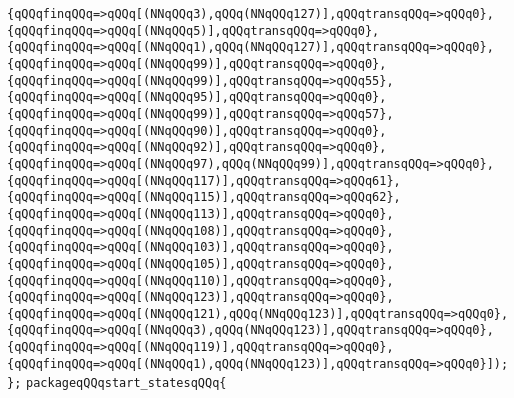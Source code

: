 \verb|{qQQqfinqQQq=>qQQq[(NNqQQq3),qQQq(NNqQQq127)],qQQqtransqQQq=>qQQq0},|\newline
\verb|{qQQqfinqQQq=>qQQq[(NNqQQq5)],qQQqtransqQQq=>qQQq0},|\newline
\verb|{qQQqfinqQQq=>qQQq[(NNqQQq1),qQQq(NNqQQq127)],qQQqtransqQQq=>qQQq0},|\newline
\verb|{qQQqfinqQQq=>qQQq[(NNqQQq99)],qQQqtransqQQq=>qQQq0},|\newline
\verb|{qQQqfinqQQq=>qQQq[(NNqQQq99)],qQQqtransqQQq=>qQQq55},|\newline
\verb|{qQQqfinqQQq=>qQQq[(NNqQQq95)],qQQqtransqQQq=>qQQq0},|\newline
\verb|{qQQqfinqQQq=>qQQq[(NNqQQq99)],qQQqtransqQQq=>qQQq57},|\newline
\verb|{qQQqfinqQQq=>qQQq[(NNqQQq90)],qQQqtransqQQq=>qQQq0},|\newline
\verb|{qQQqfinqQQq=>qQQq[(NNqQQq92)],qQQqtransqQQq=>qQQq0},|\newline
\verb|{qQQqfinqQQq=>qQQq[(NNqQQq97),qQQq(NNqQQq99)],qQQqtransqQQq=>qQQq0},|\newline
\verb|{qQQqfinqQQq=>qQQq[(NNqQQq117)],qQQqtransqQQq=>qQQq61},|\newline
\verb|{qQQqfinqQQq=>qQQq[(NNqQQq115)],qQQqtransqQQq=>qQQq62},|\newline
\verb|{qQQqfinqQQq=>qQQq[(NNqQQq113)],qQQqtransqQQq=>qQQq0},|\newline
\verb|{qQQqfinqQQq=>qQQq[(NNqQQq108)],qQQqtransqQQq=>qQQq0},|\newline
\verb|{qQQqfinqQQq=>qQQq[(NNqQQq103)],qQQqtransqQQq=>qQQq0},|\newline
\verb|{qQQqfinqQQq=>qQQq[(NNqQQq105)],qQQqtransqQQq=>qQQq0},|\newline
\verb|{qQQqfinqQQq=>qQQq[(NNqQQq110)],qQQqtransqQQq=>qQQq0},|\newline
\verb|{qQQqfinqQQq=>qQQq[(NNqQQq123)],qQQqtransqQQq=>qQQq0},|\newline
\verb|{qQQqfinqQQq=>qQQq[(NNqQQq121),qQQq(NNqQQq123)],qQQqtransqQQq=>qQQq0},|\newline
\verb|{qQQqfinqQQq=>qQQq[(NNqQQq3),qQQq(NNqQQq123)],qQQqtransqQQq=>qQQq0},|\newline
\verb|{qQQqfinqQQq=>qQQq[(NNqQQq119)],qQQqtransqQQq=>qQQq0},|\newline
\verb|{qQQqfinqQQq=>qQQq[(NNqQQq1),qQQq(NNqQQq123)],qQQqtransqQQq=>qQQq0}]);|\newline
\verb|};|\newline
\verb|packageqQQqstart_statesqQQq{|\newline
